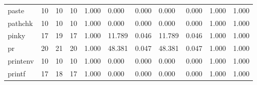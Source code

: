 \begin{longtable}{lp{1.2cm}p{1.2cm}p{1.2cm}p{1.2cm}p{1.2cm}p{1.2cm}p{1.2cm}p{1.2cm}p{1.2cm}p{1.2cm}}
paste     &                           10 &                 10 &                                10 &                                      1.000 &                                  0.000 &                                        0.000 &                             0.000 &                                   0.000 &                              1.000 &                                              1.000 \\
pathchk   &                           10 &                 10 &                                10 &                                      1.000 &                                  0.000 &                                        0.000 &                             0.000 &                                   0.000 &                              1.000 &                                              1.000 \\
pinky     &                           17 &                 19 &                                17 &                                      1.000 &                                 11.789 &                                        0.046 &                            11.789 &                                   0.046 &                              1.000 &                                              1.000 \\
pr        &                           20 &                 21 &                                20 &                                      1.000 &                                 48.381 &                                        0.047 &                            48.381 &                                   0.047 &                              1.000 &                                              1.000 \\
printenv  &                           10 &                 10 &                                10 &                                      1.000 &                                  0.000 &                                        0.000 &                             0.000 &                                   0.000 &                              1.000 &                                              1.000 \\
printf    &                           17 &                 18 &                                17 &                                      1.000 &                                  0.000 &                                        0.000 &                             0.000 &                                   0.000 &                              1.000 &                                              1.000 \\

\end{longtable}
